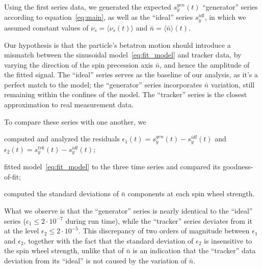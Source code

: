 \documentclass[a4paper]{jacow}
\newcommand{\avg}[1]{\langle {#1} \rangle}
\newcommand{\nbar}{\bar n}
\begin{document}

Using the first series data, we generated the expected $s_y^{gen}(t)$ ``generator'' series according to
equation~\eqref{eq:main}, as well as the ``ideal'' series $s_y^{idl}$, in which
we assumed constant values of $\nu_s = \avg{\nu_s(t)}$ and $\nbar
=\avg{\nbar}(t)$. 

Our hypothesis is that the particle's betatron
motion should introduce a mismatch between the sinusoidal
model~\eqref{eq:fit_model} and tracker data, by varying the direction
of the spin precession axis $\nbar$, and hence the amplitude of the
fitted signal. The ``ideal'' series serves as the baseline of our
analysis, as it's a perfect match to the model; the ``generator''
series incorporates $\nbar$ variation, still remaining within the confines of
the model. The ``tracker'' series is the closest approximation to
real measurement data.

To compare these series with one another, we
\begin{inparaenum}
\item computed and analyzed the residuals $\epsilon_1(t) = s_y^{gen}(t) -
s_y^{idl}(t)$ and $\epsilon_2(t) = s_y^{trk}(t) - s_y^{idl}(t)$;
\item fitted model~\eqref{eq:fit_model} to the three time series and
  compared its goodness-of-fit;
\item computed the standard deviations of $\nbar$ components at each
  spin wheel strength.
\end{inparaenum}

What we observe is that the ``generator'' series is nearly identical
to the ``ideal'' series ($\epsilon_1 \le 2\cdot10^{-7}$ during run time),
while the ``tracker'' series deviates from it at the level
$\epsilon_2 \le 2\cdot 10^{-5}$. This discrepancy of two
orders of magnitude between $\epsilon_1$ and $\epsilon_2$, together
with the fact that the standard deviation of
$\epsilon_2$ is insensitive to the spin wheel strength, unlike that of
$\nbar$ is an indication that the ``tracker'' data deviation from its ``ideal'' is
not caused by the variation of $\nbar$.
\end{document}

